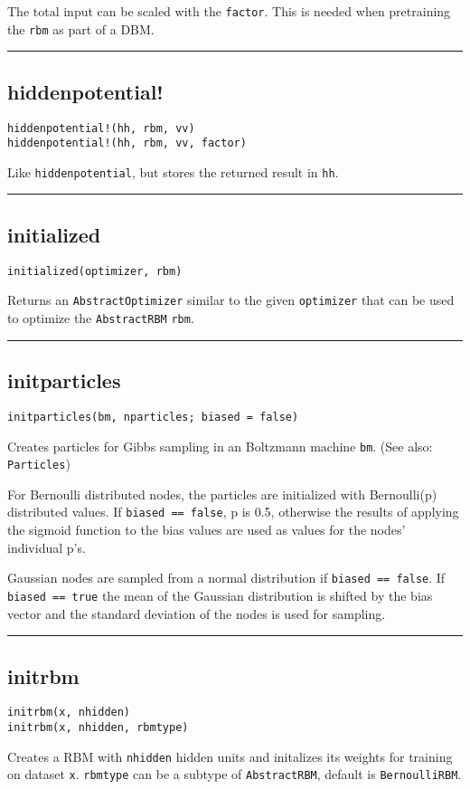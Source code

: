 The total input can be scaled with the \texttt{factor}. This is needed when pretraining the \texttt{rbm} as part of a DBM.

\noindent\rule{\textwidth}{1pt}
\subsection*{hiddenpotential!}
\begin{verbatim}
hiddenpotential!(hh, rbm, vv)
hiddenpotential!(hh, rbm, vv, factor)
\end{verbatim}
Like \texttt{hiddenpotential}, but stores the returned result in \texttt{hh}.

\noindent\rule{\textwidth}{1pt}
\subsection*{initialized}
\begin{verbatim}
initialized(optimizer, rbm)
\end{verbatim}
Returns an \texttt{AbstractOptimizer} similar to the given \texttt{optimizer} that can be used to optimize the \texttt{AbstractRBM} \texttt{rbm}.

\noindent\rule{\textwidth}{1pt}
\subsection*{initparticles}
\begin{verbatim}
initparticles(bm, nparticles; biased = false)
\end{verbatim}
Creates particles for Gibbs sampling in an Boltzmann machine \texttt{bm}. (See also: \texttt{Particles})

For Bernoulli distributed nodes, the particles are initialized with Bernoulli(p) distributed values. If \texttt{biased == false}, p is 0.5, otherwise the results of applying the sigmoid function to the bias values are used as values for the nodes' individual p's.

Gaussian nodes are sampled from a normal distribution if \texttt{biased == false}. If \texttt{biased == true} the mean of the Gaussian distribution is shifted by the bias vector and the standard deviation of the nodes is used for sampling.

\noindent\rule{\textwidth}{1pt}
\subsection*{initrbm}
\begin{verbatim}
initrbm(x, nhidden)
initrbm(x, nhidden, rbmtype)
\end{verbatim}
Creates a RBM with \texttt{nhidden} hidden units and initalizes its weights for training on dataset \texttt{x}. \texttt{rbmtype} can be a subtype of \texttt{AbstractRBM}, default is \texttt{BernoulliRBM}.

